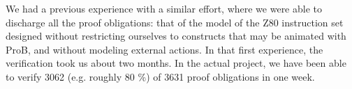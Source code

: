 \documentclass[a4paper]{llncs}
\begin{document}
%
%
%
%
We had a previous experience with a similar effort, where we were able
to discharge all the proof obligations: that of the model of the Z80
instruction set designed without restricting ourselves to constructs
that may be animated with ProB, and without modeling external actions.
In that first experience, the verification took us about two
months. In the actual project, we have been able to verify 3062
(e.g. roughly 80 \%) of 3631 proof obligations in one week.
%
%
\end{document}
